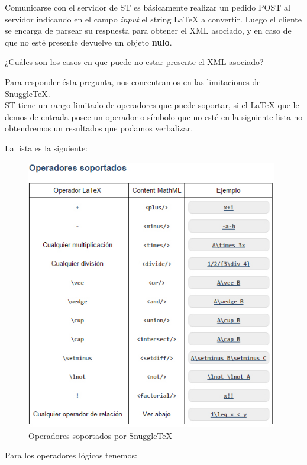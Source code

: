 Comunicarse con el servidor de ST es básicamente realizar un pedido POST al servidor indicando en el campo \textit{input} el string LaTeX a convertir. Luego el cliente se encarga de parsear su respuesta para obtener el XML asociado, y en caso de que no esté presente devuelve un objeto \textbf{nulo}.

¿Cuáles son los casos en que puede no estar presente el XML asociado?

Para responder ésta pregunta, nos concentramos en las limitaciones de SnuggleTeX. \\
ST tiene un rango limitado de operadores que puede soportar, si el LaTeX que le demos de entrada posee un operador o símbolo que no esté en la siguiente lista no obtendremos un resultados que podamos verbalizar.

La lista es la siguiente:

\begin{figure}[H]
\centering
  \includegraphics[width=11cm, height=11.84cm]{Figures/opsoportados}
  \caption[]{Operadores soportados por SnuggleTeX}
\label{fig:opsoportados}
\end{figure}

Para los operadores lógicos tenemos:

